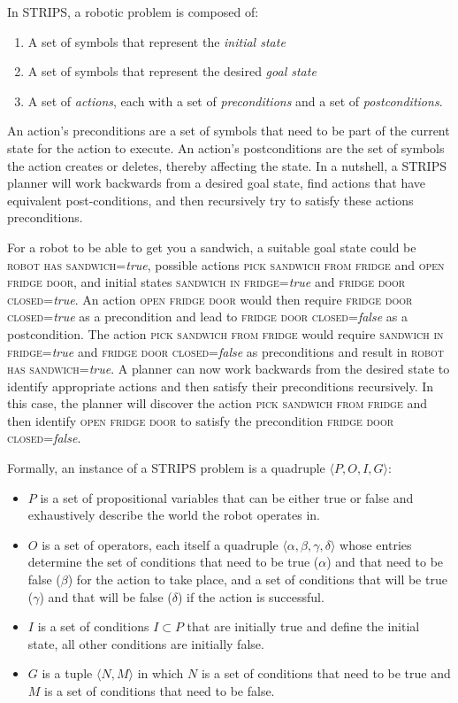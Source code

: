 In STRIPS, a robotic problem is composed of:

\begin{enumerate}
\item A set of symbols that represent the \emph{initial state}
\item A set of symbols that represent the desired \emph{goal state}
\item A set of \emph{actions}, each with a set of \emph{preconditions} and a set of \emph{postconditions}.
\end{enumerate}

An action's preconditions are a set of symbols that need to be part of the current state for the action to execute. An action's postconditions are the set of symbols the action creates or deletes, thereby affecting the state. In a nutshell, a STRIPS planner will work backwards from a desired goal state, find actions that have equivalent post-conditions, and then recursively try to satisfy these actions preconditions.

For a robot to be able to get you a sandwich, a suitable goal state could be \textsc{robot has sandwich}=\emph{true}, possible actions \textsc{pick sandwich from fridge} and \textsc{open fridge door}, and initial states \textsc{sandwich in fridge}=\emph{true} and \textsc{fridge door closed}=\emph{true}.  An action \textsc{open fridge door} would then require \textsc{fridge door closed}=\emph{true} as a precondition and lead to \textsc{fridge door closed}=\emph{false} as a postcondition. The action \textsc{pick sandwich from fridge} would require \textsc{sandwich in fridge}=\emph{true} and \textsc{fridge door closed}=\emph{false} as preconditions and result in \textsc{robot has sandwich}=\emph{true}. A planner can now work backwards from the desired state to identify appropriate actions and then satisfy their preconditions recursively. In this case, the planner will discover the action \textsc{pick sandwich from fridge} and then identify \textsc{open fridge door} to satisfy the precondition \textsc{fridge door closed}=\emph{false}.




Formally, an instance of a STRIPS problem is a quadruple $\langle P, O, I, G \rangle$:
\begin{itemize}
\item $P$ is a set of propositional variables that can be either true or false and exhaustively describe the world the robot operates in.
\item $O$ is a set of operators, each itself a quadruple $\langle \alpha, \beta, \gamma, \delta \rangle$ whose entries determine the set of conditions that need to be true ($\alpha$) and that need to be false ($\beta$) for the action to take place, and a set of conditions that will be true ($\gamma$) and that will be false ($\delta$) if the action is successful.
\item $I$ is a set of conditions $I \subset P$ that are initially true and define the initial state, all other conditions are initially false.
\item $G$ is a tuple $\langle N, M\rangle$ in which $N$ is a set of conditions that need to be true and $M$ is a set of conditions that need to be false.
\end{itemize}

